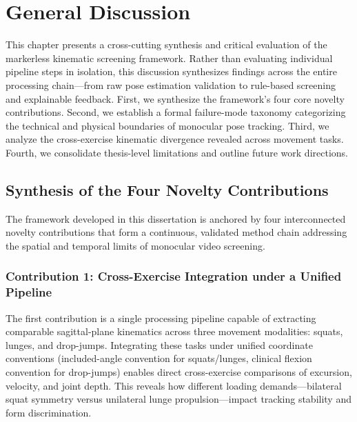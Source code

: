 \chapter{General Discussion}
\label{ch:discussion}



This chapter presents a cross-cutting synthesis and critical evaluation of the markerless kinematic screening framework. Rather than evaluating individual pipeline steps in isolation, this discussion synthesizes findings across the entire processing chain—from raw pose estimation validation to rule-based screening and explainable feedback. First, we synthesize the framework's four core novelty contributions. Second, we establish a formal failure-mode taxonomy categorizing the technical and physical boundaries of monocular pose tracking. Third, we analyze the cross-exercise kinematic divergence revealed across movement tasks. Fourth, we consolidate thesis-level limitations and outline future work directions.



\section{Synthesis of the Four Novelty Contributions}
\label{sec:14-1-synthesis-of-the-four-novelty-contributions}


The framework developed in this dissertation is anchored by four interconnected novelty contributions that form a continuous, validated method chain addressing the spatial and temporal limits of monocular video screening.

\subsection{Contribution 1: Cross-Exercise Integration under a Unified Pipeline}
\label{sec:14-1-1-contribution-1-cross-exercise-integration-under-a-unified-pipeline}

The first contribution is a single processing pipeline capable of extracting comparable sagittal-plane kinematics across three movement modalities: squats, lunges, and drop-jumps. Integrating these tasks under unified coordinate conventions (included-angle convention for squats/lunges, clinical flexion convention for drop-jumps) enables direct cross-exercise comparisons of excursion, velocity, and joint depth. This reveals how different loading demands—bilateral squat symmetry versus unilateral lunge propulsion—impact tracking stability and form discrimination.


